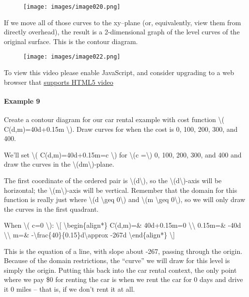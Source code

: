 \begin{figure}
\centering
\texttt{[image: images/image020.png]}
\caption{}
\end{figure}

If we move all of those curves to the xy--plane (or, equivalently, view
them from directly overhead), the result is a 2-dimensional graph of the
level curves of the original surface. This is the contour diagram.

\begin{figure}
\centering
\texttt{[image: images/image022.png]}
\caption{}
\end{figure}

To view this video please enable JavaScript, and consider upgrading to a
web browser that \href{http://videojs.com/html5-video-support/}{supports
HTML5 video}

\hypertarget{example-9}{%
\paragraph{Example 9}\label{example-9}}

Create a contour diagram for our car rental example with cost function
\textbackslash{}( C(d,m)=40d+0.15m \textbackslash{}). Draw curves for
when the cost is 0, 100, 200, 300, and 400.

We'll set \textbackslash{}( C(d,m)=40d+0.15m=c \textbackslash{}) for
\textbackslash{}(c =\textbackslash{}) 0, 100, 200, 300, and 400 and draw
the curves in the \textbackslash{}(dm\textbackslash{})-plane.

The first coordinate of the ordered pair is
\textbackslash{}(d\textbackslash{}), so the
\textbackslash{}(d\textbackslash{})-axis will be horizontal; the
\textbackslash{}(m\textbackslash{})-axis will be vertical. Remember that
the domain for this function is really just where \textbackslash{}(d
\textbackslash{}geq 0\textbackslash{}) and \textbackslash{}(m
\textbackslash{}geq 0\textbackslash{}), so we will only draw the curves
in the first quadrant.

When \textbackslash{}( c=0 \textbackslash{}): \textbackslash{}{[}
\textbackslash{}begin\{align*\} C(d,m)=\& 40d+0.15m=0
\textbackslash{}\textbackslash{} 0.15m=\& -40d
\textbackslash{}\textbackslash{} m=\&
-\textbackslash{}frac\{40\}\{0.15\}d\textbackslash{}approx -267d
\textbackslash{}end\{align*\} \textbackslash{}{]}

This is the equation of a line, with slope about -267, passing through
the origin. Because of the domain restrictions, the ``curve'' we will
draw for this level is simply the origin. Putting this back into the car
rental context, the only point where we pay \$0 for renting the car is
when we rent the car for 0 days and drive it 0 miles -- that is, if we
don't rent it at all.

